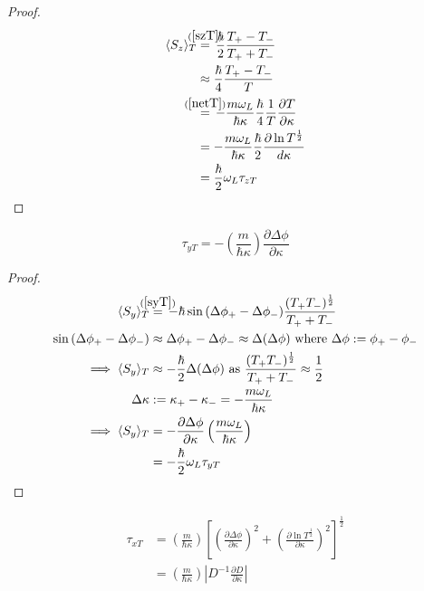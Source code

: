 \documentclass{article}
\begin{document}
\begin{proof}
\begin{subequations}
\begin{align}
	\langle S_z \rangle_T &\stackrel{\mathclap{(\ref{szT})}}{=}\,\frac{\hbar}{2}\frac{T_+-T_-}{T_++T_-}\\
	&\approx \frac{\hbar}{4}\frac{T_+-T_-}{T}\\
	&\stackrel{\mathclap{(\ref{netT})}}{=}\,-\frac{m\omega_L}{\hbar\kappa}\frac{\hbar}{4}\frac{1}{T}\frac{\partial T}{\partial \kappa} \\
	&=-\frac{m\omega_L}{\hbar\kappa}\frac{\hbar}{2}\frac{\partial\ln{T^{\frac{1}{2}}}}{d\kappa} \\
	&=\frac{\hbar}{2}\omega_L\tau_{zT}
\end{align}
\end{subequations}
\end{proof}

\begin{equation}
	\tau_{yT} = -\left(\frac{m}{\hbar\kappa}\right)\frac{\partial\Delta\phi}{\partial\kappa} \label{tauy}
\end{equation}

\begin{proof}
\begin{subequations}
\begin{align}
	\langle S_y \rangle_T &\stackrel{\mathclap{(\ref{syT})}}{=}\,-\hbar \sin{(\Delta\phi_+-\Delta\phi_-)}\frac{(T_+T_-)^{\frac{1}{2}}}{T_++T_-}\\
	\sin{(\Delta\phi_+-\Delta\phi_-)} &\approx \Delta\phi_+-\Delta\phi_- \approx \Delta(\Delta\phi) \text{ where } \Delta\phi := \phi_+-\phi_-\\
	\implies \langle S_y \rangle_T &\approx -\frac{\hbar}{2}\Delta(\Delta\phi) \text{ as } \frac{(T_+T_-)^{\frac{1}{2}}}{T_++T_-} \approx \frac{1}{2} \\
	\Delta\kappa &:= \kappa_+-\kappa_- = -\frac{m\omega_L}{\hbar\kappa} \\
\implies \langle S_y \rangle_T &= -\frac{\partial\Delta\phi}{\partial\kappa}\left(\frac{m\omega_L}{\hbar\kappa}\right) \\
			       &=-\frac{\hbar}{2}\omega_L\tau_{yT}
\end{align}
\end{subequations}
\end{proof}

\begin{subequations}\label{taux}
\begin{align}
	\tau_{xT} &= \left(\frac{m}{\hbar\kappa}\right)\left[\left(\frac{\partial\Delta\phi}{\partial\kappa}\right)^2+\left(\frac{\partial\ln{T^{\frac{1}{2}}}}{\partial\kappa}\right)^2\right]^{\frac{1}{2}}\label{tauxpart1} \\
	       &=\left(\frac{m}{\hbar\kappa}\right)\left|D^{-1}\frac{\partial D}{\partial\kappa}\right| \label{tauxpart2}
\end{align}
\end{subequations}
\end{document}
